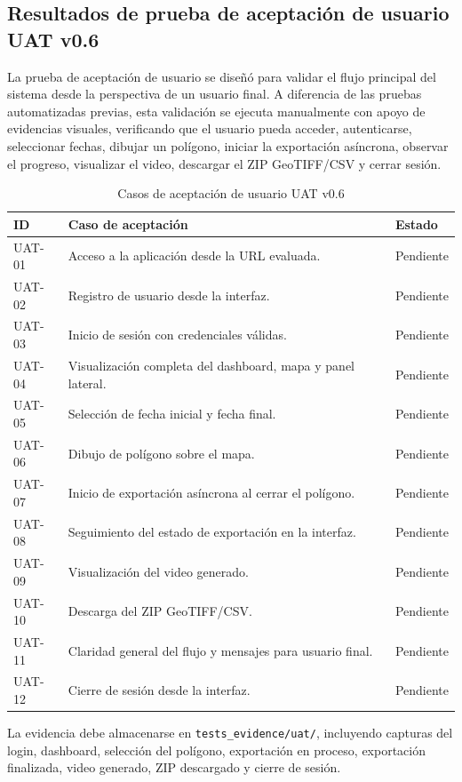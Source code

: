 
\subsection{Resultados de prueba de aceptación de usuario UAT v0.6}

La prueba de aceptación de usuario se diseñó para validar el flujo principal del sistema
desde la perspectiva de un usuario final. A diferencia de las pruebas automatizadas
previas, esta validación se ejecuta manualmente con apoyo de evidencias visuales,
verificando que el usuario pueda acceder, autenticarse, seleccionar fechas, dibujar un
polígono, iniciar la exportación asíncrona, observar el progreso, visualizar el video,
descargar el ZIP GeoTIFF/CSV y cerrar sesión.

\begin{table}[H]
\centering
\begin{tabular}{|p{2.3cm}|p{8.7cm}|p{2.2cm}|}
\hline
\textbf{ID} & \textbf{Caso de aceptación} & \textbf{Estado} \\
\hline
UAT-01 & Acceso a la aplicación desde la URL evaluada. & Pendiente \\
\hline
UAT-02 & Registro de usuario desde la interfaz. & Pendiente \\
\hline
UAT-03 & Inicio de sesión con credenciales válidas. & Pendiente \\
\hline
UAT-04 & Visualización completa del dashboard, mapa y panel lateral. & Pendiente \\
\hline
UAT-05 & Selección de fecha inicial y fecha final. & Pendiente \\
\hline
UAT-06 & Dibujo de polígono sobre el mapa. & Pendiente \\
\hline
UAT-07 & Inicio de exportación asíncrona al cerrar el polígono. & Pendiente \\
\hline
UAT-08 & Seguimiento del estado de exportación en la interfaz. & Pendiente \\
\hline
UAT-09 & Visualización del video generado. & Pendiente \\
\hline
UAT-10 & Descarga del ZIP GeoTIFF/CSV. & Pendiente \\
\hline
UAT-11 & Claridad general del flujo y mensajes para usuario final. & Pendiente \\
\hline
UAT-12 & Cierre de sesión desde la interfaz. & Pendiente \\
\hline
\end{tabular}
\caption{Casos de aceptación de usuario UAT v0.6}
\end{table}

La evidencia debe almacenarse en \texttt{tests\_evidence/uat/}, incluyendo capturas del
login, dashboard, selección del polígono, exportación en proceso, exportación finalizada,
video generado, ZIP descargado y cierre de sesión.

